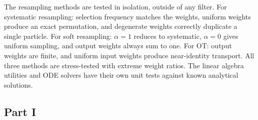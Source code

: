 \documentclass{article}
\begin{document}
The resampling methods are tested in isolation, outside of any filter. For systematic resampling: selection frequency matches the weights, uniform weights produce an exact permutation, and degenerate weights correctly duplicate a single particle. For soft resampling: $\alpha = 1$ reduces to systematic, $\alpha = 0$ gives uniform sampling, and output weights always sum to one. For OT: output weights are finite, and uniform input weights produce near-identity transport. All three methods are stress-tested with extreme weight ratios. The linear algebra utilities and ODE solvers have their own unit tests against known analytical solutions.



\newpage
\subsection{Part I}
\end{document}

